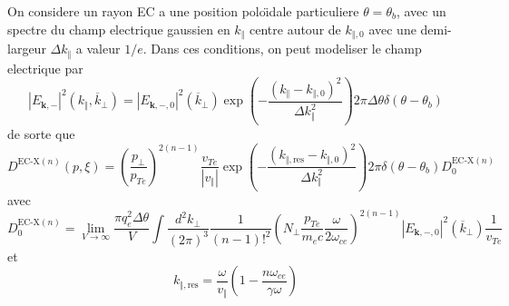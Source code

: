 On considere un rayon EC a une position polo\"{\i}dale particuliere
$\theta=\theta_{b}$, avec un spectre du champ electrique gaussien
en $k_{\Vert}$ centre autour de $k_{\Vert,0}$ avec une demi-largeur
$\Delta k_{\Vert}$ a valeur $1/e$. Dans ces conditions, on peut
modeliser le champ electrique par \[
\left|E_{\mathbf{k},-}\right|^{2}(k_{\Vert},\overline{k}_{\bot})=\left|E_{\mathbf{k},-,0}\right|^{2}(\overline{k}_{\bot})\exp\left(-\frac{\left(k_{\Vert}-k_{\Vert,0}\right)^{2}}{\Delta k_{\Vert}^{2}}\right)2\pi\Delta\theta\delta(\theta-\theta_{b})\]
 de sorte que \[
D^{\text{EC-X}(n)}(p,\xi)=\left(\frac{p_{\bot}}{p_{Te}}\right)^{2(n-1)}\frac{v_{Te}}{\left|v_{\Vert}\right|}\exp\left(-\frac{\left(k_{\Vert,\text{res}}-k_{\Vert,0}\right)^{2}}{\Delta k_{\Vert}^{2}}\right)2\pi\delta(\theta-\theta_{b})D_{0}^{\text{EC-X}(n)}\]
 avec \[
D_{0}^{\text{EC-X}(n)}=\lim_{V\rightarrow\infty}\frac{\pi q_{e}^{2}\Delta\theta}{V}\int\frac{d^{2}k_{\bot}}{(2\pi)^{3}}\frac{1}{(n-1)!^{2}}\left(N_{\bot}\frac{p_{Te}}{m_{e}c}\frac{\omega}{2\omega_{ce}}\right)^{2(n-1)}\left|E_{\mathbf{k},-,0}\right|^{2}(\overline{k}_{\bot})\frac{1}{v_{Te}}\]
 et \[
k_{\Vert,\text{res}}=\frac{\omega}{v_{\Vert}}\left(1-\frac{n\omega_{ce}}{\gamma\omega}\right)\]


